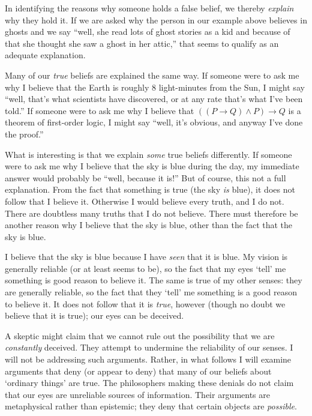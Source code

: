 \documentclass[11pt]{standalone}
\begin{document}
\begin{spacing}{1.5}
In identifying the reasons why someone holds a false belief, we
thereby {\em explain} why they hold it.  If we are asked why the
person in our example above believes in ghosts and we say ``well, she
read lots of ghost stories as a kid and because of that she thought
she saw a ghost in her attic,'' that seems to qualify as an adequate
explanation.

Many of our {\em true} beliefs are explained the same way.  If someone
were to ask me why I believe that the Earth is roughly 8 light-minutes
from the Sun, I might say ``well, that's what scientists have
discovered, or at any rate that's what I've been told.''  If someone
were to ask me why I believe that $((P \rightarrow Q ) \wedge P)
\rightarrow Q$ is a theorem of first-order logic, I might say ``well,
it's obvious, and anyway I've done the proof.''

What is interesting is that we explain {\em some} true beliefs
differently.  If someone were to ask me why I believe that the sky is
blue during the day, my immediate answer would probably be ``well,
because it is!''  But of course, this not a full explanation.  From
the fact that something is true (the sky {\em is} blue), it does not
follow that I believe it.  Otherwise I would believe every truth, and
I do not.  There are doubtless many truths that I do not believe.
There must therefore be another reason why I believe that the sky is
blue, other than the fact that the sky is blue.

I believe that the sky is blue because I have {\em seen} that it is
blue.  My vision is generally reliable (or at least seems to be), so
the fact that my eyes `tell' me something is good reason to believe
it.  The same is true of my other senses: they are generally reliable,
so the fact that they `tell' me something is a good reason to believe
it.  It does not follow that it is {\em true}, however (though no
doubt we believe that it is true); our eyes can be deceived.  

A skeptic might claim that we cannot rule out the possibility that we
are {\em constantly} deceived.  They attempt to undermine the
reliability of our senses.  I will not be addressing such arguments.
Rather, in what follows I will examine arguments that deny (or appear
to deny) that many of our beliefs about `ordinary things' are true.
The philosophers making these denials do not claim that our eyes are
unreliable sources of information.  Their arguments are metaphysical
rather than epistemic; they deny that certain objects are {\em
  possible}.  


\end{spacing}
\end{document}
